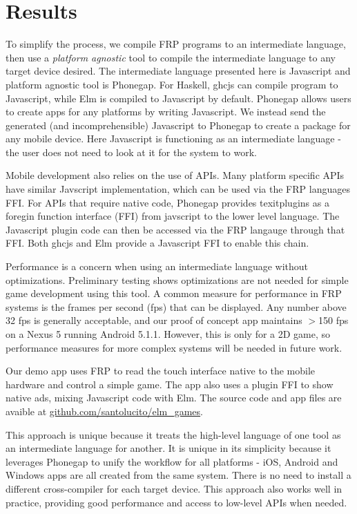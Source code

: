 \documentclass[preprint]{sigplanconf}
\begin{document}
\section{Results}
To simplify the process, we compile FRP programs to an intermediate language, then use a \textit{platform agnostic} tool to compile the intermediate language to any target device desired.
The intermediate language presented here is Javascript and platform agnostic tool is Phonegap.
For Haskell, ghcjs can compile program to Javascript, while Elm is compiled to Javascript by default\cite{ghcjs}.
Phonegap allows users to create apps for any platforms by writing Javascript\cite{phonegap}. 
We instead send the generated (and incomprehensible) Javascript to Phonegap to create a package for any mobile device.
Here Javascript is functioning as an intermediate language - the user does not need to look at it for the system to work.

Mobile development also relies on the use of APIs.
Many platform specific APIs have similar Javscript implementation, which can be used via the FRP languages FFI.
For APIs that require native code, Phonegap provides texit{plugins} as a foregin function interface (FFI) from javscript to the lower level language.
The Javascript plugin code can then be accessed via the FRP langauge through that FFI.
Both ghcjs and Elm provide a Javascript FFI to enable this chain. 

Performance is a concern when using an intermediate language without optimizations. 
Preliminary testing shows optimizations are not needed for simple game development using this tool. 
A common measure for performance in FRP systems is the frames per second (fps) that can be displayed.
Any number above 32 fps is generally acceptable, and our proof of concept app maintains $>$150 fps on a Nexus 5 running Android 5.1.1.
However, this is only for a 2D game, so performance measures for more complex systems will be needed in future work.

Our demo app uses FRP to read the touch interface native to the mobile hardware and control a simple game.
The app also uses a plugin FFI to show native ads, mixing Javascript code with Elm.
The source code and app files are avaible at \url{github.com/santolucito/elm_games}.

This approach is unique because it treats the high-level language of one tool as an intermediate language for another. 
It is unique in its simplicity because it leverages Phonegap to unify the workflow for all platforms - iOS, Android and Windows apps are all created from the same system.
There is no need to install a different cross-compiler for each target device.
This approach also works well in practice, providing good performance and access to low-level APIs when needed.
 
\end{document}

